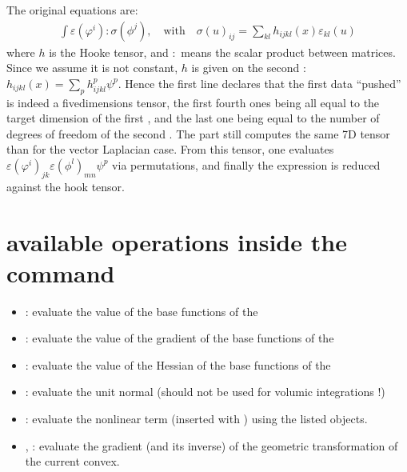 \documentclass[a4paper,11pt,english]{sphinxmanual}
\begin{document}
The original equations are:
\begin{equation*}
\begin{split}\int\varepsilon(\varphi^i):\sigma(\phi^j),
\quad\text{with}\quad
\sigma(u)_{ij}=\sum_{kl} h_{ijkl}(x) \varepsilon_{kl}(u)\end{split}
\end{equation*}
where \(h\) is the Hooke tensor, and \(:\) means the scalar product
between matrices. Since we assume it is not constant, \(h\) is given on the
second : \(h_{ijkl}(x)=\sum_p h_{ijkl}^p \psi^p\). Hence the first line
declares that the first data “pushed” is indeed a five\sphinxhyphen{}dimensions tensor, the
first fourth ones being all equal to the target dimension of the first , and
the last one being equal to the number of degrees of freedom of the second .
The  part still computes the same 7D tensor than for the vector Laplacian
case. From this tensor, one evaluates
\(\varepsilon(\varphi^i)_{jk}\varepsilon(\phi^l)_{mn}\psi^p\) via
permutations, and finally the expression is reduced against the hook tensor.


\section{available operations inside the  command}
\label{\detokenize{userdoc/gasm_low:available-operations-inside-the-comp-command}}\begin{itemize}
\item {} 
: evaluate the value of the base functions of the  

\item {} 
: evaluate the value of the gradient of the base functions of the
 

\item {} 
: evaluate the value of the Hessian of the base functions of the
 

\item {} 
: evaluate the unit normal (should not be used for volumic
integrations !)

\item {} 
: evaluate the  non\sphinxhyphen{}linear term (inserted
with ) using the listed 
objects.

\item {} 
, : evaluate the gradient (and its inverse) of the
geometric transformation of the current convex.

\end{itemize}
\end{document}
